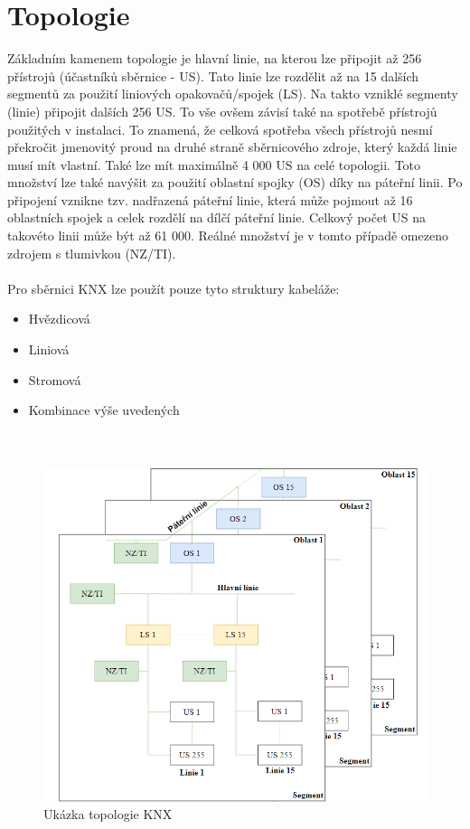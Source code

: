 \section{Topologie}
Základním kamenem topologie je hlavní linie, na kterou lze připojit až 256 přístrojů (účastníků sběrnice - US). Tato linie lze rozdělit až na 15 dalších segmentů za použití liniových opakovačů/spojek (LS). Na takto vzniklé segmenty (linie) připojit dalších 256 US. To vše ovšem závisí také na spotřebě přístrojů použitých v instalaci. To znamená, že celková spotřeba všech přístrojů nesmí překročit jmenovitý proud na druhé straně sběrnicového zdroje, který každá linie musí mít vlastní. Také lze mít maximálně 4 000 US na celé topologii. Toto množství lze také navýšit za použití oblastní spojky (OS) díky na páteřní linii. Po připojení vznikne tzv. nadřazená páteřní linie, která může pojmout až 16 oblastních spojek a celek rozdělí na dílčí páteřní linie. Celkový počet US na takovéto linii může být až 61 000. Reálné množství je v tomto případě omezeno zdrojem s tlumivkou (NZ/TI). \cite{Topologie}\\\\
Pro sběrnici KNX lze použít pouze tyto struktury kabeláže:
\begin{itemize}
    \item Hvězdicová
     \item Liniová
     \item Stromová
     \item Kombinace výše uvedených\\ \\ \\
\end{itemize}
\begin{figure}[!h]
  \begin{center}
    \includegraphics[scale=0.6]{obrazky/Ukazka topologie.png}
  \end{center}
  \caption[Ukázka topologie KNX\cite{Topologie}]{Ukázka topologie KNX\cite{Topologie}}
  \label{fig:Ukázka topologie KNX}
\end{figure}

